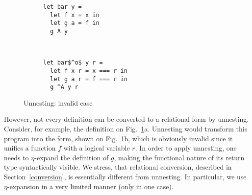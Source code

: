 \begin{figure}[t]
\centering
\begin{subfigure}[t]{0.4\textwidth}
 \centering
\begin{lstlisting}
let bar y =
  let f x = x in
  let g a = f in
  g A y
\end{lstlisting}
\vspace{-1\baselineskip}
    \caption{}
  \end{subfigure}
  ~
  \begin{subfigure}[t]{0.4\textwidth}
    \centering
\begin{lstlisting}
let bar$^o$ y r =
  let f x r = x === r in
  let g a r = f === r in
  g ^A y r
\end{lstlisting}
\vspace{-1\baselineskip}
  \caption{}
  \end{subfigure}
  \vskip4mm
\caption{Unnesting: invalid case}
\label{unnesting_invalid}
\end{figure}

However, not every definition can be converted to a relational form by unnesting. Consider, for example, the definition on Fig.~\ref{unnesting_invalid}a.
Unnesting would transform this program into the form, shown on Fig.~\ref{unnesting_invalid}b, which is obviously invalid since it unifies a
function $f$ with a logical variable $r$. In order to apply unnesting, one needs to $\eta$-expand the definition of $g$, making the functional nature of
its return type syntactically visible.
We stress, that relational conversion, described in Section~\ref{conversion}, is essentially different from unnesting. In particular, 
we use $\eta$-expansion in a very limited manner (only in one case).

\begin{comment}

and for the aforementioned example the result of relational
conversion looks as follows:

\begin{lstlisting}
   let bar$^o$ y =
     let f x = x in
     let g a = f in
     g (fun q. q === ^A) y
\end{lstlisting}

Note, the majority of definitions are left intact; the only difference with the functional version comes from the use of the constructor 
\lstinline|A|, which was transformed into a goal-returning function.

\end{comment}

